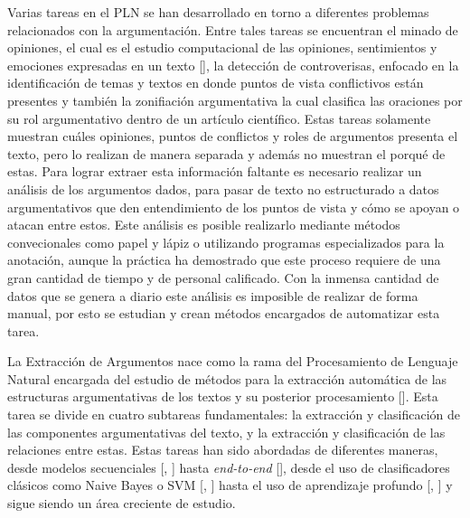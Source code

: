 
Varias tareas en el PLN se han desarrollado en torno a diferentes problemas relacionados con 
la argumentación. Entre tales tareas se encuentran el minado de opiniones, el cual es el 
estudio computacional de las opiniones, sentimientos y emociones expresadas en un texto 
[\cite{liu2010sentiment}], la detección de controverisas, enfocado en la identificación de 
temas y textos en donde puntos de vista conflictivos están presentes y también la zonifiación
argumentativa la cual clasifica las oraciones por su rol argumentativo dentro de un artículo
científico. Estas tareas solamente muestran cuáles opiniones, puntos de conflictos y roles 
de argumentos 
presenta el texto, pero lo realizan de manera separada y además no muestran el porqué de estas. 
Para lograr extraer esta información faltante es necesario realizar un 
análisis de los argumentos dados, para pasar de texto no estructurado a datos argumentativos 
que den entendimiento de los puntos de vista y cómo se apoyan o atacan entre estos. Este análisis
es posible realizarlo mediante métodos convecionales como papel y lápiz o utilizando programas
especializados para la anotación, aunque la práctica ha demostrado que este proceso requiere 
de una gran cantidad de tiempo y de personal calificado. Con la inmensa cantidad de datos 
que se genera a diario este análisis es imposible de realizar de forma manual, por esto se 
estudian y crean métodos encargados de automatizar esta tarea.


La Extracción de Argumentos nace como la rama del Procesamiento de Lenguaje Natural encargada
del estudio de métodos para la extracción automática de las estructuras argumentativas de 
los textos y su posterior procesamiento [\cite{lawrence2020argument}]. Esta tarea se divide en 
cuatro subtareas fundamentales: la extracción y clasificación de las componentes argumentativas del texto, y la extracción y 
clasificación de las relaciones entre estas. Estas tareas han sido abordadas de diferentes maneras,
desde modelos secuenciales [\cite{palau2009argumentation}, \cite{goudas2015argument}] hasta 
\emph{end-to-end} [\cite{eger2017neural}], desde el uso de clasificadores clásicos 
como Naive Bayes o SVM [\cite{niculae2017argument}, \cite{stab2017parsing}] hasta el uso de 
aprendizaje profundo [\cite{galassi2021deep}, \cite{mayer2020transformer}] y sigue 
siendo un área creciente de estudio.

